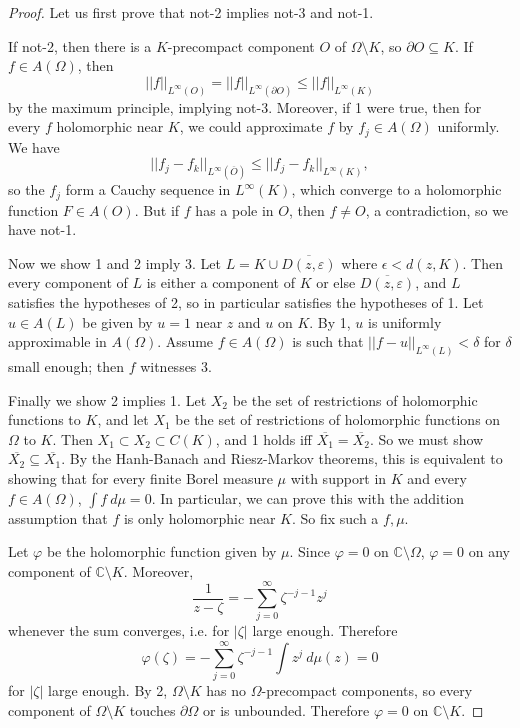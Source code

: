 \documentclass[12pt]{report}
\newcommand{\CC}{\mathbb{C}}
\theoremstyle{definition}
\begin{document}
\begin{proof}
    Let us first prove that not-2 implies not-3 and not-1.
    
    If not-2, then there is a $K$-precompact component $O$ of $\Omega \setminus K$, so $\partial O \subseteq K$. If $f \in A(\Omega)$, then
    $$||f||_{L^\infty(O)} = ||f||_{L^\infty(\partial O)} \leq ||f||_{L^\infty(K)}$$
    by the maximum principle, implying not-3. Moreover, if 1 were true, then for every $f$ holomorphic near $K$, we could approximate $f$ by $f_j \in A(\Omega)$ uniformly. We have
    $$||f_j - f_k||_{L^\infty(\overline O)} \leq ||f_j - f_k||_{L^\infty(K)},$$
    so the $f_j$ form a Cauchy sequence in $L^\infty(K)$, which converge to a holomorphic function $F \in A(O)$. But if $f$ has a pole in $O$, then $f \neq O$, a contradiction, so we have not-1.
    
    Now we show 1 and 2 imply 3. Let $L = K \cup \overline{D(z, \varepsilon)}$ where $\epsilon < d(z, K)$. Then every component of $L$ is either a component of $K$ or else $\overline{D(z, \varepsilon)}$, and $L$ satisfies the hypotheses of 2, so in particular satisfies the hypotheses of 1. Let $u \in A(L)$ be given by $u = 1$ near $z$ and $u$ on $K$. By 1, $u$ is uniformly approximable in $A(\Omega)$. Assume $f \in A(\Omega)$ is such that $||f - u||_{L^\infty(L)} < \delta$ for $\delta$ small enough; then $f$ witnesses 3.
    
    Finally we show 2 implies 1. Let $X_2$ be the set of restrictions of holomorphic functions to $K$, and let $X_1$ be the set of restrictions of holomorphic functions on $\Omega$ to $K$. Then $X_1 \subset X_2 \subset C(K)$, and 1 holds iff $\overline{X_1} = \overline{X_2}$. So we must show $\overline{X_2} \subseteq \overline{X_1}$. By the Hanh-Banach and Riesz-Markov theorems, this is equivalent to showing that for every finite Borel measure $\mu$ with support in $K$ and every $f \in A(\Omega)$, $\int f ~d\mu = 0$. In particular, we can prove this with the addition assumption that $f$ is only holomorphic near $K$. So fix such a $f, \mu$.
    
    Let $\varphi$ be the holomorphic function given by $\mu$. Since $\varphi = 0$ on $\CC \setminus \Omega$, $\varphi = 0$ on any component of $\CC \setminus K$. Moreover,
    $$\frac{1}{z - \zeta} = -\sum_{j=0}^\infty \zeta^{-j-1}z^j$$
    whenever the sum converges, i.e. for $|\zeta|$ large enough. Therefore
    $$\varphi(\zeta) = -\sum_{j=0}^\infty \zeta^{-j-1} \int z^j ~d\mu(z) = 0$$
    for $|\zeta|$ large enough. By 2, $\Omega \setminus K$ has no $\Omega$-precompact components, so every component of $\Omega \setminus K$ touches $\partial \Omega$ or is unbounded. Therefore $\varphi = 0$ on $\CC \setminus K$. 
    

\end{proof}
\end{document}
